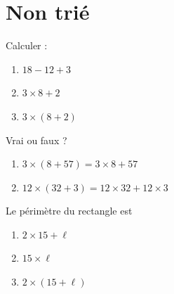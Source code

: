 
\section{Non trié}

\begin{MentalActivity}
    \begin{mental}
        Calculer :
        \begin{enumerate}
            \item
                \( 18-12+3\)
            \item
                \( 3\times 8+2\)
            \item
                \( 3\times (8+2)\)
        \end{enumerate}
    \end{mental}

    \begin{mental}
        Vrai ou faux ?
        \begin{enumerate}
            \item
                \( 3\times (8+57)=3\times 8+57\)
            \item
                \( 12\times (32+3)=12\times 32+12\times 3\)
        \end{enumerate}
    \end{mental}
    
    \begin{mental}

        \begin{center}
   
        \end{center}
        
        Le périmètre du rectangle est
        \begin{enumerate}
            \item
                \( 2\times 15+\ell\)
            \item
                \( 15\times \ell\)
            \item
                \( 2\times (15+\ell)\)
        \end{enumerate}


\end{mental}
\end{MentalActivity}
